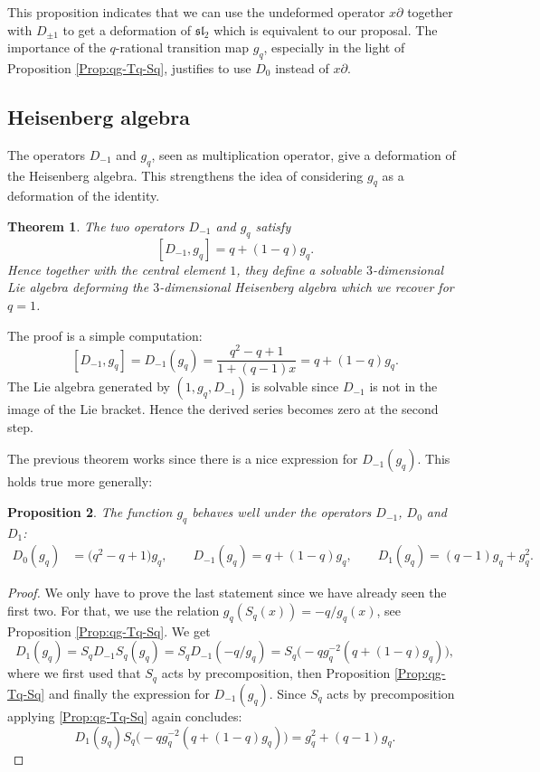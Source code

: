 \documentclass[pdftex]{sigma}
\numberwithin{equation}{section}
\newtheorem{Theorem}{Theorem}[section]
\newtheorem{Proposition}[Theorem]{Proposition}
 { \theoremstyle{definition}
\newtheorem{Definition}[Theorem]{Definition}
\newtheorem{Note}[Theorem]{Note}
\newtheorem{Example}[Theorem]{Example}
\newtheorem{Remark}[Theorem]{Remark} }
\begin{document}
This proposition indicates that we can use the undeformed operator $x\partial$ together with $D_{\pm 1}$ to get a deformation of $\mathfrak{sl}_2$ which is equivalent to our proposal. The importance of the $q$-rational transition map $g_q$, especially in the light of Proposition \ref{Prop:qg-Tq-Sq}, justifies to use $D_0$ instead of $x\partial$.


\subsection{Heisenberg algebra}
The operators $D_{-1}$ and $g_q$, seen as multiplication operator, give a deformation of the Heisenberg algebra. This strengthens the idea of considering $g_q$ as a deformation of the identity.

\begin{Theorem}
The two operators $D_{-1}$ and $g_q$ satisfy
\[
[D_{-1},g_q]=q+(1-q)g_q.
\]
Hence together with the central element $1$, they define a solvable $3$-dimensional Lie algebra deforming the $3$-dimensional Heisenberg algebra which we recover for $q=1$.
\end{Theorem}

The proof is a simple computation:
\[[D_{-1},g_q]=D_{-1}(g_q)=\frac{q^2-q+1}{1+(q-1)x}=q+(1-q)g_q.
\]
The Lie algebra generated by $(1,g_q,D_{-1})$ is solvable since $D_{-1}$ is not in the image of the Lie bracket. Hence the derived series becomes zero at the second step.

The previous theorem works since there is a nice expression for $D_{-1}(g_q)$. This holds true more generally:
\begin{Proposition}\label{Prop:op-diff-gq}
The function $g_q$ behaves well under the operators $D_{-1}$, $D_0$ and $D_1$:
\begin{align*}
D_0(g_q) &= \big(q^2-q+1\big)g_q, \qquad
D_{-1}(g_q) = q+(1-q)g_q, \qquad
D_1(g_q) = (q-1)g_q+g_q^2.
\end{align*}
\end{Proposition}
\begin{proof}
We only have to prove the last statement since we have already seen the first two. For that, we use the relation $g_q(S_q(x))=-q/g_q(x)$, see Proposition \ref{Prop:qg-Tq-Sq}. We get
\[
D_1(g_q)=S_qD_{-1}S_q(g_q)=S_qD_{-1}(-q/g_q)=S_q\bigl(-qg_q^{-2}(q+(1-q)g_q)\bigr),
\]
where we first used that $S_q$ acts by precomposition, then Proposition \ref{Prop:qg-Tq-Sq} and finally the expression for $D_{-1}(g_q)$. Since $S_q$ acts by precomposition applying \ref{Prop:qg-Tq-Sq} again concludes:
\[
D_1(g_q)S_q\bigl(-qg_q^{-2}(q+(1-q)g_q)\bigr)=g_q^2+(q-1)g_q.\tag*{\qed}
\]\renewcommand{\qed}{}
\end{proof}
\end{document}
